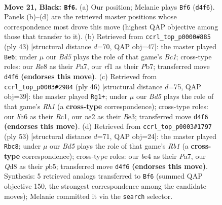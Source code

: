 \documentclass[11pt]{article}
\begin{document}
\clearpage

\begin{figure}[p]\centering
\begin{subfigure}{0.46\textwidth}\centering
\resizebox{\linewidth}{!}{%
\newchessgame
\chessboard[
  setfen={2bqr1k1/p2ppp2/7B/P1p2P1Q/2PbB3/6P1/1r2N2K/R4R2 b - - 0 21},
  showmover=false,
  pgfstyle=straightmove, color=movearrow, markmove={d4-f6}
]}
\caption{}
\end{subfigure}\hfill
\begin{subfigure}{0.46\textwidth}\centering
\resizebox{\linewidth}{!}{%
\newchessgame
\chessboard[
  setfen={r1b2k2/pp2q2r/2pN1pR1/2n5/1bP2Q2/8/PP3P1P/2KR1B2 b - - 0 22},
  showmover=false,
  pgfstyle=straightmove, color=movearrow, markmove={c8-e6}
]}
\caption{}
\end{subfigure}
\\[4pt]
\begin{subfigure}{0.46\textwidth}\centering
\resizebox{\linewidth}{!}{%
\newchessgame
\chessboard[
  setfen={r5k1/4q2p/p1bp1r2/1p6/7P/P1PpB3/1P3P2/2RQK2R w K - 0 24},
  showmover=false,
  pgfstyle=straightmove, color=movearrow, markmove={h1-g1}
]}
\caption{}
\end{subfigure}\hfill
\begin{subfigure}{0.46\textwidth}\centering
\resizebox{\linewidth}{!}{%
\newchessgame
\chessboard[
  setfen={1r1r2k1/pp4bp/8/PP1Ppb1q/8/1Q4Pp/1B1N1P1P/R3R1K1 b - - 0 27},
  showmover=false,
  pgfstyle=straightmove, color=movearrow, markmove={b8-c8}
]}
\caption{}
\end{subfigure}
\caption{\textbf{Move 21, Black: \texttt{Bf6}.} (a) Our position; Melanie plays \texttt{Bf6} (\texttt{d4f6}). Panels (b)--(d) are the retrieved master positions whose correspondence most drove this move (highest QAP objective among those that transfer to it). (b) Retrieved from \texttt{ccrl\_top\_p0000\#885} (ply 43) [structural distance $d$=70, QAP obj=47]: the master played \texttt{Be6}; under $\mu$ our \emph{Bd5} plays the role of that game's \emph{Bc1}; cross-type roles: our \emph{R}e8 as their \emph{P}a7, our \emph{r}f1 as their \emph{P}b7; transferred move \texttt{d4f6} \textbf{(endorses this move)}. (c) Retrieved from \texttt{ccrl\_top\_p0003\#2984} (ply 46) [structural distance $d$=75, QAP obj=39]: the master played \texttt{Rg1+}; under $\mu$ our \emph{Bd5} plays the role of that game's \emph{Rh1} (a \textbf{cross-type} correspondence); cross-type roles: our \emph{b}h6 as their \emph{R}c1, our \emph{n}e2 as their \emph{B}e3; transferred move \texttt{d4f6} \textbf{(endorses this move)}. (d) Retrieved from \texttt{ccrl\_top\_p0003\#1797} (ply 53) [structural distance $d$=71, QAP obj=24]: the master played \texttt{Rbc8}; under $\mu$ our \emph{Bd5} plays the role of that game's \emph{Rb1} (a \textbf{cross-type} correspondence); cross-type roles: our \emph{b}e4 as their \emph{P}a7, our \emph{Q}d8 as their \emph{p}b5; transferred move \texttt{d4f6} \textbf{(endorses this move)}. Synthesis: 5 retrieved analogs transferred to \texttt{Bf6} (summed QAP objective 150, the strongest correspondence among the candidate moves); Melanie committed it via the \texttt{search} selector.}
\label{fig:thought-m41}
\end{figure}
\end{document}
